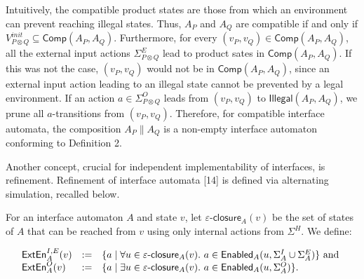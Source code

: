 \documentclass[10pt,a4paper]{article}
\begin{document}
 
 
 
Intuitively, the compatible product states are those from which an environment can prevent reaching illegal states. Thus, $A_{P}$ and $A_{Q}$ are compatible if and only if $V_{P\otimes Q}^{init}\subseteq\mathsf{Comp}(A_{P},A_{Q})$. Furthermore, for every $(v_{P},v_{Q})\in\mathsf{Comp}(A_{P},A_{Q})$, all the external input actions $\Sigma_{P\otimes Q}^{E}$ lead to product sates in $\mathsf{Comp}(A_{P},A_{Q})$. If this was not the case, $(v_{P},v_{Q})$ would not be in $\mathsf{Comp}(A_{P},A_{Q})$, since an external input action leading to an illegal state cannot be prevented by a legal environment. If an action $a\in\Sigma_{P\otimes Q}^{O}$ leads from $(v_{P},v_{Q})$ to $\mathsf{Illegal}(A_{P},A_{Q})$, we prune all $a$-transitions from $(v_{P},v_{Q})$. Therefore, for compatible interface automata, the composition $A_{P}\parallel A_{Q}$ is a non-empty interface automaton conforming to Definition 2.\par
 
 
 
Another concept, crucial for independent implementability of interfaces, is refinement. Refinement of interface automata [14] is defined via alternating simulation, recalled below.\par
 
 
 
For an interface automaton $A$ and state $v$, let $\varepsilon\text{-}\mathsf{closure}_{A}(v)$ be the set of states of $A$ that can be reached from $v$ using only internal actions from $\Sigma^{H}$. We define:\par
  
\par  \quad  \[\begin{array}[]{lll}\mathsf{ExtEn}^{I,E}_{A}(v)&:=&\{a\mid\forall u\in\varepsilon\text{-}\mathsf{closure}_{A}(v).\nobreak\ a\in\mathsf{Enabled}_{A}(u,\Sigma_{A}^{I}\cup\Sigma_{A}^{E})\}\text{ and }\\
\mathsf{ExtEn}^{O}_{A}(v)&:=&\{a\mid\exists u\in\varepsilon\text{-}\mathsf{closure}_{A}(v).\nobreak\ a\in\mathsf{Enabled}_{A}(u,\Sigma_{A}^{O})\}.\end{array}\]\quad  \quad  
  
\end{document}
